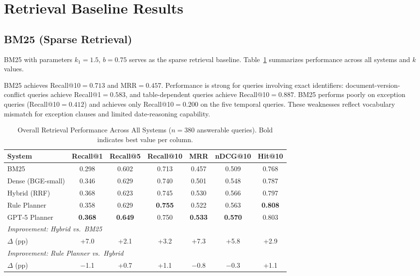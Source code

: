\section{Retrieval Baseline Results}
\label{sec:results_baselines}

\subsection{BM25 (Sparse Retrieval)}

BM25 with parameters $k_1{=}1.5$, $b{=}0.75$ serves as the sparse retrieval baseline. Table~\ref{tab:retrieval_performance} summarizes performance across all systems and $k$ values.

BM25 achieves Recall@10$={0.713}$ and MRR$={0.457}$. Performance is strong for queries involving exact identifiers: document-version-conflict queries achieve Recall@1$={0.583}$, and table-dependent queries achieve Recall@10$={0.887}$. BM25 performs poorly on exception queries (Recall@10$={0.412}$) and achieves only Recall@10$={0.200}$ on the five temporal queries. These weaknesses reflect vocabulary mismatch for exception clauses and limited date-reasoning capability.

\begin{table}[htbp]
\centering
\caption{Overall Retrieval Performance Across All Systems ($n{=}380$ answerable queries). Bold indicates best value per column.}
\label{tab:retrieval_performance}
\begin{tabular}{lcccccc}
\toprule
\textbf{System} & \textbf{Recall@1} & \textbf{Recall@5} & \textbf{Recall@10} & \textbf{MRR} & \textbf{nDCG@10} & \textbf{Hit@10} \\
\midrule
BM25                & 0.298 & 0.602 & 0.713 & 0.457 & 0.509 & 0.768 \\
Dense (BGE-small)   & 0.346 & 0.629 & 0.740 & 0.501 & 0.548 & 0.787 \\
Hybrid (RRF)        & 0.368 & 0.623 & 0.745 & 0.530 & 0.566 & 0.797 \\
Rule Planner        & 0.358 & 0.629 & \textbf{0.755} & 0.522 & 0.563 & \textbf{0.808} \\
GPT-5 Planner       & \textbf{0.368} & \textbf{0.649} & 0.750 & \textbf{0.533} & \textbf{0.570} & 0.803 \\
\midrule
\multicolumn{7}{l}{\textit{Improvement: Hybrid vs.\ BM25}} \\
$\Delta$ (pp)       & +7.0  & +2.1  & +3.2  & +7.3  & +5.8  & +2.9  \\
\multicolumn{7}{l}{\textit{Improvement: Rule Planner vs.\ Hybrid}} \\
$\Delta$ (pp)       & $-$1.1 & +0.7  & +1.1  & $-$0.8 & $-$0.3 & +1.1  \\
\bottomrule
\end{tabular}
\end{table}


